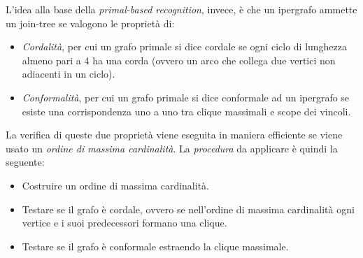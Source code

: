 \documentclass[11pt,oneside]{book}
\begin{document}
L'idea alla base della \textit{primal-based recognition}, invece, è che un ipergrafo ammette un join-tree se valogono le proprietà di:
\begin{itemize}
    \item \textit{Cordalità}, per cui un grafo primale si dice cordale se ogni ciclo di lunghezza almeno pari a 4 ha una corda (ovvero un arco che collega due vertici non adiacenti in un ciclo).
    \item \textit{Conformalità}, per cui un grafo primale si dice conformale ad un ipergrafo se esiste una corrispondenza uno a uno tra clique massimali e scope dei vincoli.
\end{itemize}
La verifica di queste due proprietà viene eseguita in maniera efficiente se viene usato un \textit{ordine di massima cardinalità}. La \textit{procedura} da applicare è quindi la seguente:
\begin{itemize}
	\item Costruire un ordine di massima cardinalità.
	\item Testare se il grafo è cordale, ovvero se nell'ordine di massima cardinalità ogni vertice e i suoi predecessori formano una clique.
	\item Testare se il grafo è conformale estraendo la clique massimale.
\end{itemize}
\end{document}

